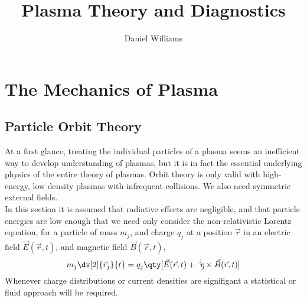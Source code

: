 \documentclass{book}         		                %
\title{Plasma Theory and Diagnostics}
\author{Daniel Williams}
\begin{document}
 \maketitle


\tableofcontents

\chapter{The Mechanics of Plasma}
\label{cha:mechanics-plasma}

\section{Particle Orbit Theory}
\label{sec:part-orbit-theory}

At a first glance, treating the individual particles of a plasma seems
an inefficient way to develop understanding of plasmas, but it is in
fact the essential underlying physics of the entire theory of plasmas.
Orbit theory is only valid with high-energy, low density plasmas with
infrequent collisions. We also need symmetric external fields. \\
In this section it is assumed that radiative effects are negligible,
and that particle energies are low enough that we need only consider
the non-relativistic Lorentz equation, for a particle of mass $m_j$,
and charge $q_j$ at a position $\vec{r}$ in an electric field
$\vec{E}(\vec{r}, t)$, and magnetic field $\vec{B}(\vec{r}, t)$,
\begin{equation}
  \label{eq:lorentzeq}
  m_j \dv[2]{\vec{r}_j}{t} = q_j \qty[ \vec{E}(\vec{r},t) + \dot{\vec{r}_j} \times \vec{B}(\vec{r}, t) ]
\end{equation}
Whenever charge distributions or current densities are signifigant a
statistical or fluid approach will be required.

\end{document}
